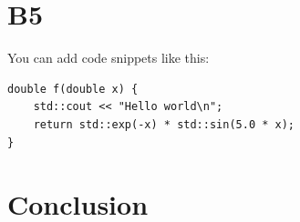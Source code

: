 \documentclass[12pt,a4paper,onecolumn]{article}%
\begin{document}
\section{B5}

You can add code snippets like this:

\begin{lstlisting}
double f(double x) {
    std::cout << "Hello world\n";
    return std::exp(-x) * std::sin(5.0 * x);
}
\end{lstlisting}

\section{Conclusion}
\end{document}
